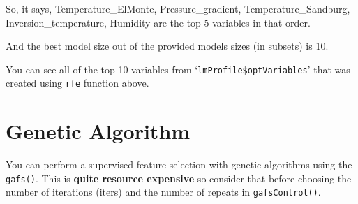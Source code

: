 \documentclass[]{book}
\begin{document}
So, it says, Temperature\_ElMonte, Pressure\_gradient, Temperature\_Sandburg, Inversion\_temperature, Humidity are the top 5 variables in that order.

And the best model size out of the provided models sizes (in subsets) is 10.

You can see all of the top 10 variables from `\texttt{lmProfile\$optVariables}' that was created using \texttt{rfe} function above.

\hypertarget{genetic-algorithm}{%
\section{Genetic Algorithm}\label{genetic-algorithm}}

You can perform a supervised feature selection with genetic algorithms using the \texttt{gafs()}. This is \textbf{quite resource expensive} so consider that before choosing the number of iterations (iters) and the number of repeats in \texttt{gafsControl()}.
\end{document}

